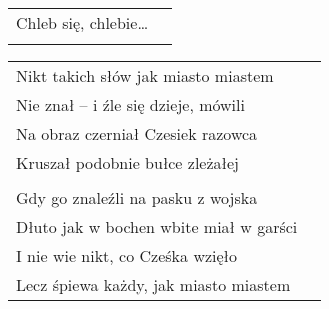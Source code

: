 \documentclass[a5paper]{article}
\begin{document}
\noindent
\begin{tabular}{@{}p{8.5cm}p{3cm}@{}} 
Chleb się, chlebie… \\ \\
\end{tabular}

\noindent
\begin{tabular}{@{}p{8.5cm}p{3cm}@{}}
Nikt takich słów jak miasto miastem \\
Nie znał – i źle się dzieje, mówili \\
Na obraz czerniał Czesiek razowca \\
Kruszał podobnie bułce zleżałej \\ \\
 
Gdy go znaleźli na pasku z wojska \\
Dłuto jak w bochen wbite miał w garści \\
I nie wie nikt, co Cześka wzięło \\
Lecz śpiewa każdy, jak miasto miastem
\end{tabular}
\end{document}

